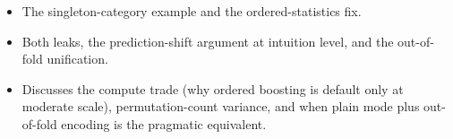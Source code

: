 \begin{interviewq}
\goodgreat
\begin{itemize}
    \item {} The singleton-category example and the ordered-statistics fix.
    \item {} Both leaks, the prediction-shift argument at intuition level, and the out-of-fold unification.
    \item {} Discusses the compute trade (why ordered boosting is default only at moderate scale), permutation-count variance, and when plain mode plus out-of-fold encoding is the pragmatic equivalent.
\end{itemize}

\end{interviewq}

